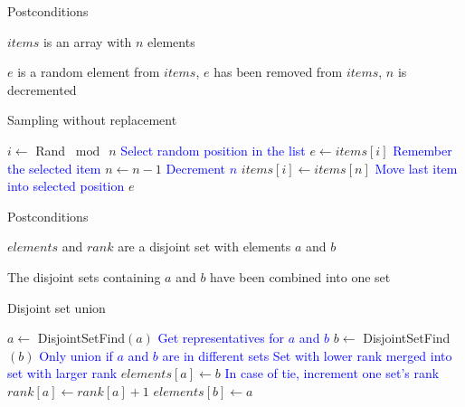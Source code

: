\begin{algorithm}[H]
    \vskip6pt
    \begin{labeling}{Postconditions}
        \item [\bf Preconditions] $items$ is an array with $n$ elements
        \item [\bf Postconditions] $e$ is a random element from $items$, $e$ has been
        removed from $items$, $n$ is decremented
    \end{labeling}

    \caption{Sampling without replacement}\label{alg:sample-no-replacement}
    \begin{algorithmic}[1]
        \State $i\gets$ {\sc Rand} $\bmod\ n$
        \Comment\textcolor{blue}{Select random position in the list}
        \State $e\gets items[i]$
        \Comment\textcolor{blue}{Remember the selected item}
        \State $n\gets n-1$
        \Comment\textcolor{blue}{Decrement $n$}
        \State $items[i]\gets items[n]$
        \Comment\textcolor{blue}{Move last item into selected position}
        \Statex
         $e$
        \EndProcedure
    \end{algorithmic}
\end{algorithm}
\vskip12pt

\begin{algorithm}[H]
    \vskip6pt
    \begin{labeling}{Postconditions}
        \item [\bf Preconditions] $elements$ and $rank$ are a disjoint set with
        elements $a$ and $b$
        \item [\bf Postconditions] The disjoint sets containing $a$ and $b$ have been
        combined into one set
    \end{labeling}

    \caption{Disjoint set union}\label{alg:ds-union}
    \begin{algorithmic}[1]
        \State $a\gets$ {\sc DisjointSetFind}$(a)$
        \Comment\textcolor{blue}{Get representatives for $a$ and $b$}
        \State $b\gets$ {\sc DisjointSetFind}$(b)$
        \Statex
        \Comment\textcolor{blue}{Only union if $a$ and $b$ are in different sets}
        \Comment\textcolor{blue}{Set with lower rank merged into set with larger
        rank}
        \State $elements[a]\gets b$
        \Else
        \Comment\textcolor{blue}{In case of tie, increment one set's rank}
        \State $rank[a]\gets rank[a]+1$
        \EndIf
        \State $elements[b]\gets a$
        \EndIf
        \EndIf
        \EndProcedure
    \end{algorithmic}
\end{algorithm}
\vskip12pt

